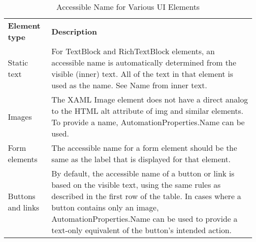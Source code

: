 \begin{table}[htbp]
  \centering
  \caption{Accessible Name for Various UI Elements}
    \label{tab:accessibleNameWP8}%
    \renewcommand{\arraystretch}{1.2}
    \begin{tabularx}{\textwidth}{l|X}
    \rowcolor{mygray}
    \textbf{Element type} & \textbf{Description} \\
    Static text & For TextBlock and RichTextBlock elements, an accessible name is automatically determined from the visible (inner) text. All of the text in that element is used as the name. See Name from inner text. \\ \hline
    Images & The XAML Image element does not have a direct analog to the HTML alt attribute of img and similar elements. To provide a name, AutomationProperties.Name can be used. \\ \hline
    Form elements & The accessible name for a form element should be the same as the label that is displayed for that element.\\ \hline
    Buttons and links & By default, the accessible name of a button or link is based on the visible text, using the same rules as described in the first row of the table. In cases where a button contains only an image, AutomationProperties.Name can be used to provide a text-only equivalent of the button's intended action. \\
    \end{tabularx}%
\end{table}%
